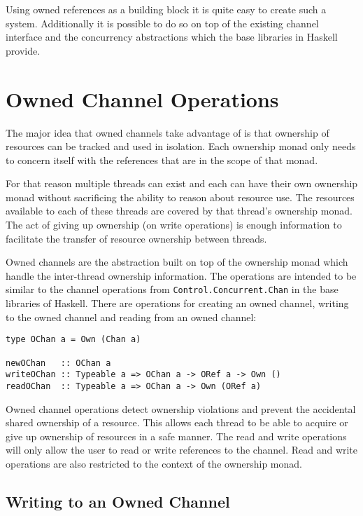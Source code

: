 \documentclass[onehalf,11pt]{beavtex}
\begin{document}
Using owned references as a building block it is quite easy to create
such a system.  Additionally it is possible to do so on top of the existing
channel interface and the concurrency abstractions which the base libraries
in Haskell provide.

\section{Owned Channel Operations}

The major idea that owned channels take advantage of is that ownership
of resources can be tracked and used in isolation. Each ownership monad only
needs to concern itself with the references that are in the scope of that monad.

For that reason multiple threads can exist and each can have their own
ownership monad without sacrificing the ability to reason about resource use.
The resources available to each of these threads are covered by that thread's
ownership monad.
The act of giving up ownership (on write operations) is enough information to
facilitate the transfer of resource ownership between threads.

Owned channels are the abstraction built on top of the ownership monad which
handle the inter-thread ownership information. The operations are intended
to be similar to the channel operations from \texttt{Control.Concurrent.Chan}
in the base libraries of Haskell. There are operations for creating an owned
channel, writing to the owned channel and reading from an owned channel:

\begin{verbatim}
type OChan a = Own (Chan a)

newOChan   :: OChan a
writeOChan :: Typeable a => OChan a -> ORef a -> Own ()
readOChan  :: Typeable a => OChan a -> Own (ORef a)
\end{verbatim}

Owned channel operations detect ownership violations and prevent the
accidental shared ownership of a resource.
This allows each thread to be able to acquire or give up ownership of resources
in a safe manner. The read and write operations will only allow the user to
read or write references to the channel. Read and write operations are also
restricted to the context of the ownership monad.

\subsection{Writing to an Owned Channel}
\end{document}
